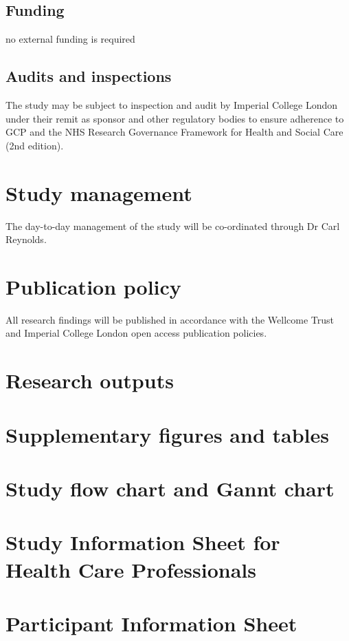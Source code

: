 \documentclass[a4paper,10pt]{article}
\begin{document}
\begin{enumerate}
\subsection{Funding}
no external funding is required

\subsection{Audits and inspections}
The study may be subject to inspection and audit by Imperial College London under their remit as sponsor and other regulatory bodies to ensure adherence to GCP and the NHS Research Governance Framework for Health and Social Care (2nd edition). 

\section{Study management}
The day-to-day management of the study will be co-ordinated through Dr Carl Reynolds.

\section{Publication policy}
All research findings will be published in accordance with the Wellcome Trust and Imperial College London open access publication policies.


\begin{appendices}

\section{Research outputs}


\section{Supplementary figures and tables}



\section{Study flow chart and Gannt chart}


\section{Study Information Sheet for Health Care Professionals}

\section{Participant Information Sheet}


\end{appendices}
\end{enumerate}
\end{document}
